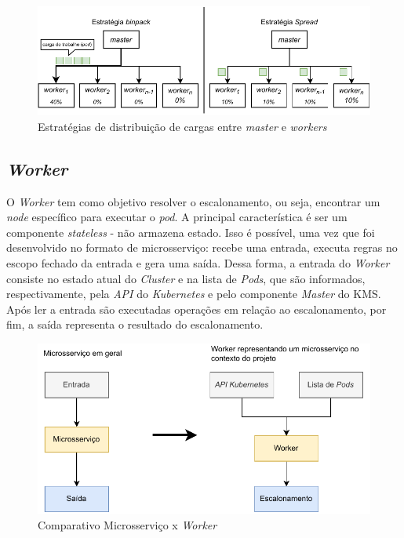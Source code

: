 \begin{figure}[h!]
	\caption{\label{fig:distribuicao_cargas} Estratégias de distribuição de cargas entre \textit{master} e \textit{workers}}
	\centering
		\includegraphics[width=\linewidth]{assets/distribuicao-trabalho.pdf}
\end{figure}

\subsection{\textit{Worker}}

O \textit{Worker} tem como objetivo resolver o escalonamento, ou seja, encontrar um \textit{node} específico para executar o \textit{pod}. A principal característica é ser um componente \textit{stateless} - não armazena estado. Isso é possível, uma vez que foi desenvolvido no formato de microsserviço: recebe uma entrada, executa regras no escopo fechado da entrada e gera uma saída. Dessa forma, a entrada do \textit{Worker} consiste no estado atual do \textit{Cluster} e na lista de \textit{Pods}, que são informados, respectivamente, pela \textit{API} do \textit{Kubernetes} e pelo componente \textit{Master} do \ac{KMS}. Após ler a entrada são executadas operações em relação ao escalonamento, por fim, a saída representa o resultado do escalonamento.

\begin{figure}[h!]
	\caption{\label{fig:microsservico-worker} Comparativo Microsserviço x \textit{Worker}}
	\centering
	\includegraphics[width=\linewidth]{assets/microsservico-worker.pdf}
\end{figure}

